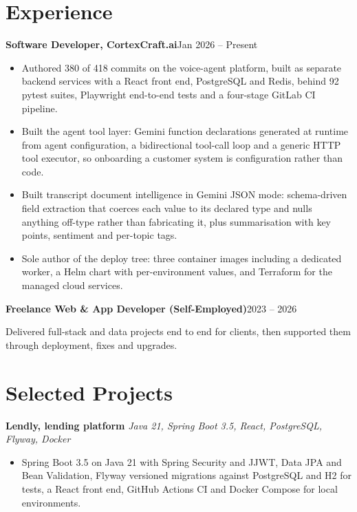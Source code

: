\documentclass[10pt,a4paper]{article}
\newcommand{\entry}[2]{\textbf{#1}\hfill{#2}\par}
\begin{document}
\section{Experience}

\entry{Software Developer, CortexCraft.ai}{Jan 2026 -- Present}
\begin{itemize}
  \item Authored 380 of 418 commits on the voice-agent platform, built as separate backend services
        with a React front end, PostgreSQL and Redis, behind 92 pytest suites, Playwright end-to-end
        tests and a four-stage GitLab CI pipeline.
  \item Built the agent tool layer: Gemini function declarations generated at runtime from agent
        configuration, a bidirectional tool-call loop and a generic HTTP tool executor, so onboarding
        a customer system is configuration rather than code.
  \item Built transcript document intelligence in Gemini JSON mode: schema-driven field extraction
        that coerces each value to its declared type and nulls anything off-type rather than
        fabricating it, plus summarisation with key points, sentiment and per-topic tags.
  \item Sole author of the deploy tree: three container images including a dedicated worker, a Helm
        chart with per-environment values, and Terraform for the managed cloud services.
\end{itemize}

\vspace{1pt}
\entry{Freelance Web \& App Developer (Self-Employed)}{2023 -- 2026}
Delivered full-stack and data projects end to end for clients, then supported them through
deployment, fixes and upgrades.

\section{Selected Projects}

\textbf{Lendly, lending platform} \textit{Java 21, Spring Boot 3.5, React, PostgreSQL, Flyway, Docker}
\begin{itemize}
  \item Spring Boot 3.5 on Java 21 with Spring Security and JJWT, Data JPA and Bean Validation,
        Flyway versioned migrations against PostgreSQL and H2 for tests, a React front end, GitHub
        Actions CI and Docker Compose for local environments.
\end{itemize}
\end{document}
